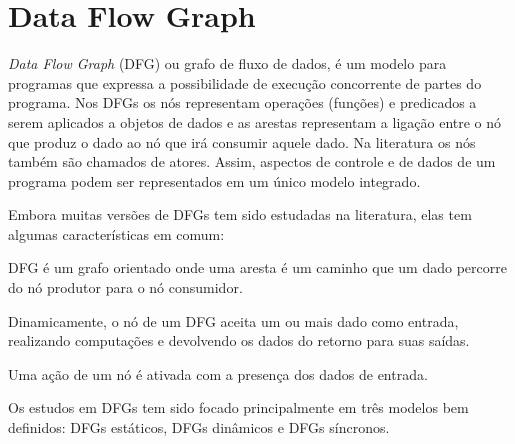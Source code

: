 
\chapter{Data Flow Graph}

\textit{Data Flow Graph} (DFG) ou grafo de fluxo de dados, é um modelo para 
programas que expressa a possibilidade de execução concorrente de partes do
programa. 
Nos DFGs os nós representam operações (funções) e predicados a serem
aplicados a objetos de dados e as arestas representam a ligação entre o nó que
produz o dado ao nó que irá consumir aquele dado.
Na literatura os nós também são chamados de atores.
Assim, aspectos de controle e de dados de um programa podem ser representados 
em um único modelo integrado.

Embora muitas versões de DFGs tem sido estudadas na literatura, elas tem algumas
características em comum:

\begin{alineas}
        \item DFG é um grafo orientado onde uma aresta é um caminho que um dado
        percorre do nó produtor para o nó consumidor.
        \item Dinamicamente, o nó de um DFG aceita um ou mais dado como entrada,
        realizando computações e devolvendo os dados do retorno para suas
        saídas.
        \item Uma ação de um nó é ativada com a presença dos dados de entrada.
\end{alineas}

Os estudos em DFGs tem sido focado principalmente em três modelos bem definidos:
DFGs estáticos, DFGs dinâmicos e DFGs síncronos.



